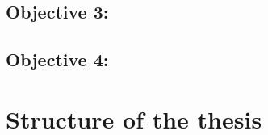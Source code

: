 \newcommand{\objectiveframework}{}

\subsection*{Objective 3: \objectiveframework}
\label{subsec:intro:obj:fwork}

\newcommand{\objectiveresearch}{} 

\subsection*{Objective 4: \objectiveresearch}
\label{subsec:intro:obj:applications}



\section{Structure of the thesis}
\label{sec:intro:structure}


